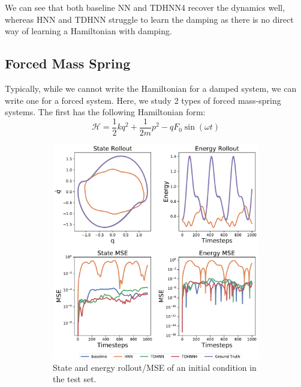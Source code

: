 \documentclass[twoside]{article}
\begin{document}
We can see that both baseline NN and TDHNN4 recover the dynamics well, whereas HNN and TDHNN struggle to learn the damping as there is no direct way of learning a Hamiltonian with damping.

\subsection{Forced Mass Spring}

Typically, while we cannot write the Hamiltonian for a damped system, we can write one for a forced system. Here, we study 2 types of forced mass-spring systems. The first has the following Hamiltonian form:
\begin{equation}
\mathcal{H} = \frac{1}{2}kq^2 + \frac{1}{2m}p^2 - qF_0\sin(\omega t) 
\end{equation}
\begin{figure}[h!]
\centering
\captionsetup{justification=centering}
	\begin{subfigure}[b]{0.4\textwidth}
		\centering
		\includegraphics[width=\textwidth]{figures/forced_mass_spring_1.pdf}
		\caption{State and energy rollout/MSE of an initial condition in the test set.}
	\end{subfigure}
	\begin{subfigure}[b]{0.48\textwidth}

\end{subfigure}
\end{figure}
\end{document}
